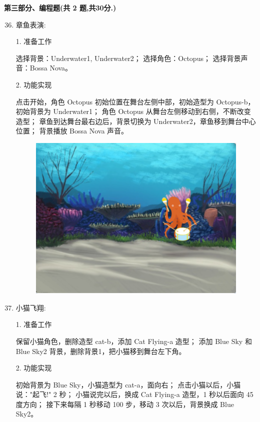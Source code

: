 \documentclass[10pt, a4paper]{article}
\begin{document}
    \newpage
    {\noindent \textbf{第三部分、编程题(共 2 题,共30分.)}}
    \begin{enumerate}
        \setcounter{enumi}{35}
        
        \item 章鱼表演:
        
        1. 准备工作
        \begin{tasks}[label = (\arabic*)]
            \task 选择背景：Underwater1, Underwater2；
            \task 选择角色：Octopus；
            \task 选择背景声音：Bossa Nova。
        \end{tasks}
        2. 功能实现
        \begin{tasks}[label = (\arabic*)]
            \task 点击开始，角色 Octopus 初始位置在舞台左侧中部，初始造型为 Octopus-b，初始背景为 Underwater1；
            \task 角色 Octopus 从舞台左侧移动到右侧，不断改变造型；
            \task 章鱼到达舞台最右边后，背景切换为 Underwater2，章鱼移到舞台中心位置；
            \task 背景播放 Bossa Nova 声音。
        \end{tasks}
        \begin{figure}[htbp]
            \centering
            \includegraphics[width=.26\textwidth]{36.png}
        \end{figure}

        \item 小猫飞翔:
        
        1. 准备工作
        \begin{tasks}[label = (\arabic*)]
            \task 保留小猫角色，删除造型 cat-b，添加 Cat Flying-a 造型；
            \task 添加 Blue Sky 和 Blue Sky2 背景，删除背景1，把小猫移到舞台左下角。
        \end{tasks}
        2. 功能实现
        \begin{tasks}[label = (\arabic*)]
            \task 初始背景为 Blue Sky，小猫造型为 cat-a，面向右；
            \task 点击小猫以后，小猫说："起飞!" 2 秒；
            \task 小猫说完以后，换成 Cat Flying-a 造型，1 秒以后面向 45 度方向；
            \task 接下来每隔 1 秒移动 100 步，移动 3 次以后，背景换成 Blue Sky2。
        \end{tasks}


\end{enumerate}
\end{document}
